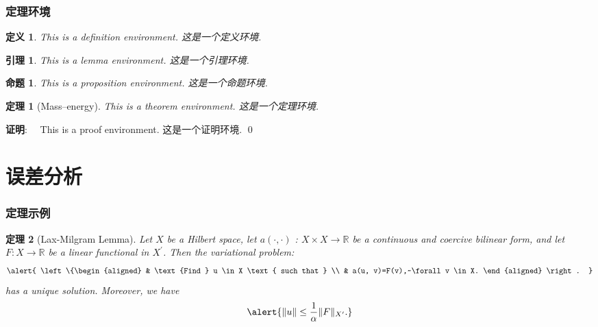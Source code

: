 \documentclass[notheorems,11pt,compress]{beamer}
\numberwithin{figure}{section}
\numberwithin{table}{section}
\numberwithin{equation}{section}
\theoremstyle{plain}
\newtheorem{theorem}{定理} %
\numberwithin{theorem}{section}
\newtheorem{definition}{定义}
\numberwithin{definition}{section}
\newtheorem{lemma}{引理}
\numberwithin{lemma}{section}
\newtheorem{proposition}{命题}
\numberwithin{proposition}{section}
\numberwithin{corollary}{section}
\theoremstyle{example}
\renewenvironment{proof}[1][证明]{\textbf{#1}:~~}{\qed\par}
\begin{document}
\begin{frame}
	\frametitle{定理环境}
	\begin{definition}
		This is a definition environment. 这是一个定义环境.
	\end{definition}

	\begin{lemma}
		This is a lemma environment. 这是一个引理环境.
	\end{lemma}

	\begin{proposition}
		This is a proposition environment. 这是一个命题环境.
	\end{proposition}

	\begin{theorem}[Mass--energy]
		This is a theorem environment. 这是一个定理环境.
	\end{theorem}

	\begin{proof}
		This is a proof environment. 这是一个证明环境.
	\end{proof}

\end{frame}

\section{误差分析}

\begin{frame}
	\frametitle{定理示例}

	\begin{theorem}[Lax-Milgram Lemma] \upshape
		Let $X$ be a Hilbert space, let $a(\cdot, \cdot)$ : $X \times X \rightarrow \mathbb{R}$ be a continuous and coercive bilinear form, and let $F : X \rightarrow \mathbb{R}$ be a linear functional in $X^{\prime}$. Then the variational problem:
		\begin{equation}
			\alert{
				\left\{\begin{aligned}
					 & \text {Find } u \in X \text { such that } \\
					 & a(u, v)=F(v),~\forall v \in X.
				\end{aligned} \right. }
		\end{equation}
		has a unique solution. Moreover, we have
		\begin{equation}
			\alert{ \|u\| \leq \frac{1}{\alpha}\|F\|_{X^{\prime}}.  }
		\end{equation}
	\end{theorem}

\end{frame}
\end{document}
